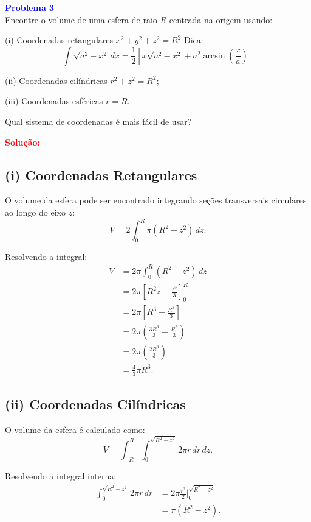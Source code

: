 \documentclass[a4paper,12pt]{article}
\begin{document}
\begin{flushleft}
\textbf{\textcolor{blue}{\Large Problema 3}}\\
Encontre o volume de uma esfera de raio $R$ centrada na origem usando:

(i) Coordenadas retangulares $x^2 + y^2 + z^2 = R^2$ \newline
Dica:
\begin{equation}
\int \sqrt{a^2 - x^2} \, dx = \frac{1}{2} \left[ x\sqrt{a^2 - x^2} + a^2 \arcsin\left(\frac{x}{a}\right) \right]
\end{equation}

(ii) Coordenadas cilíndricas $r^2 + z^2 = R^2$;

(iii) Coordenadas esféricas $r = R$.

Qual sistema de coordenadas é mais fácil de usar?

\textcolor{red}{\textbf{Solução:}}\\

\subsection*{(i) Coordenadas Retangulares}
O volume da esfera pode ser encontrado integrando seções transversais circulares ao longo do eixo $z$:
\begin{equation}
V = 2 \int_0^R \pi (R^2 - z^2) \, dz.
\end{equation}

Resolvendo a integral:
\begin{align*}
V &= 2\pi \int_0^R (R^2 - z^2) \, dz \\
&= 2\pi \left[ R^2z - \frac{z^3}{3} \right]_0^R \\
&= 2\pi \left[ R^3 - \frac{R^3}{3} \right] \\
&= 2\pi \left( \frac{3R^3}{3} - \frac{R^3}{3} \right) \\
&= 2\pi \left( \frac{2R^3}{3} \right) \\
&= \frac{4}{3} \pi R^3.
\end{align*}

\subsection*{(ii) Coordenadas Cilíndricas}
O volume da esfera é calculado como:
\begin{equation}
V = \int_{-R}^{R} \int_0^{\sqrt{R^2 - z^2}} 2\pi r \, dr \, dz.
\end{equation}

Resolvendo a integral interna:
\begin{align*}
\int_0^{\sqrt{R^2 - z^2}} 2\pi r \, dr &= 2\pi \frac{r^2}{2} \Big|_0^{\sqrt{R^2 - z^2}} \\
&= \pi (R^2 - z^2).
\end{align*}


\end{flushleft}
\end{document}
